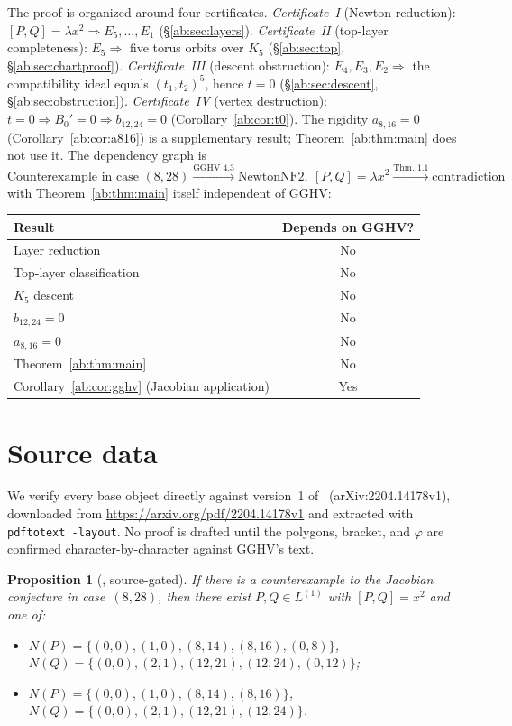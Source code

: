 \documentclass[a4paper,11pt]{article}
\theoremstyle{plain}
\newtheorem{proposition}[theorem]{Proposition}
\theoremstyle{definition}
\theoremstyle{remark}
\begin{document}
The proof is organized around four certificates. \emph{Certificate~I} (Newton reduction): $[P,Q]=\lambda x^2\Rightarrow E_5,\dots,E_1$ (\S\ref{ab:sec:layers}). \emph{Certificate~II} (top-layer completeness): $E_5\Rightarrow$ five torus orbits over $K_5$ (\S\ref{ab:sec:top}, \S\ref{ab:sec:chartproof}). \emph{Certificate~III} (descent obstruction): $E_4,E_3,E_2\Rightarrow$ the compatibility ideal equals $(t_1,t_2)^5$, hence $t=0$ (\S\ref{ab:sec:descent}, \S\ref{ab:sec:obstruction}). \emph{Certificate~IV} (vertex destruction): $t=0\Rightarrow B_0'=0\Rightarrow b_{12,24}=0$ (Corollary~\ref{ab:cor:t0}). The rigidity $a_{8,16}=0$ (Corollary~\ref{ab:cor:a816}) is a supplementary result; Theorem~\ref{ab:thm:main} does not use it. The dependency graph is
\[
\boxed{\text{Counterexample in case }(8,28)\xrightarrow{\text{GGHV 4.3}} \text{NewtonNF2},\ [P,Q]=\lambda x^2 \xrightarrow{\text{Thm.~1.1}} \text{contradiction}}
\]
with Theorem~\ref{ab:thm:main} itself independent of GGHV:
\begin{center}
\begin{tabular}{l|c}
\textbf{Result} & \textbf{Depends on GGHV?} \\ \midrule
Layer reduction & No \\
Top-layer classification & No \\
$K_5$ descent & No \\
$b_{12,24}=0$ & No \\
$a_{8,16}=0$ & No \\
Theorem~\ref{ab:thm:main} & No \\
Corollary~\ref{ab:cor:gghv} (Jacobian application) & Yes
\end{tabular}
\end{center}

\section{Source data}\label{ab:sec:source}

We verify every base object directly against version~1 of~\cite{GGHV} (arXiv:2204.14178v1), downloaded from \url{https://arxiv.org/pdf/2204.14178v1} and extracted with \texttt{pdftotext -layout}. No proof is drafted until the polygons, bracket, and $\varphi$ are confirmed character-by-character against GGHV's text.

\begin{proposition}[{\cite[Proposition~4.3]{GGHV}, source-gated}]\label{ab:prop:gghv43}
If there is a counterexample to the Jacobian conjecture in case~$(8,28)$, then there exist $P,Q\in L^{(1)}$ with $[P,Q]=x^2$ and one of:
\begin{itemize}[nosep]
\item[(1)] $N(P)=\{(0,0),(1,0),(8,14),(8,16),(0,8)\}$,\\
$N(Q)=\{(0,0),(2,1),(12,21),(12,24),(0,12)\}$;
\item[(2)] $N(P)=\{(0,0),(1,0),(8,14),(8,16)\}$,\\
$N(Q)=\{(0,0),(2,1),(12,21),(12,24)\}$.
\end{itemize}
\end{proposition}
\end{document}
